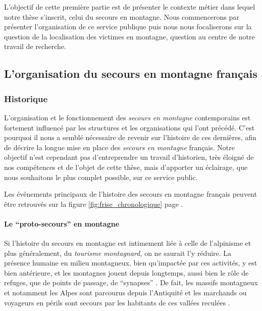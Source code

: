 L'objectif de cette première partie est de présenter le contexte
métier dans lequel notre thèse s'inscrit, celui du secours en
montagne. Nous commencerons par présenter l'organisation de ce service
publique puis nous nous focaliserons sur la question de la
localisation des victimes en montagne, question au centre de notre
travail de recherche.

\subsection{L’organisation du secours en montagne français}
\label{subsec:1-1-1}

\subsubsection{Historique}
\label{subsubsec:1-1-1-1}

L'organisation et le fonctionnement des \emph{secours en montagne}
contemporains est fortement influencé par les structures et les
organisations qui l'ont précédé. C'est pourquoi il nous a semblé
nécessaire de revenir sur l'histoire de ces dernières, afin de décrire
la longue mise en place des \emph{secours en montagne} français. Notre
objectif n'est cependant pas d'entreprendre un travail d'historien,
très éloigné de nos compétences et de l'objet de cette thèse, mais
d'apporter un éclairage, que nous souhaitons le plus complet possible,
sur ce service public.

Les événements principaux de l'histoire des secours en montagne
français peuvent être retrouvés sur la figure
\ref{fig:frise_chronologique} page \pageref{fig:frise_chronologique}.

\paragraph{Le \enquote{proto-secours} en montagne}
\label{par:1-1-1-1-1}

Si l'histoire du secours en montagne est intimement liée à celle de
l'alpinisme et plus généralement, du \emph{tourisme montagnard,} on ne
saurait l'y réduire. La présence humaine en milieu montagneux, bien
qu'impactée par ces activités, y est bien antérieure, et les montagnes
jouent depuis longtemps, aussi bien le rôle de refuges, que de points
de passage, de \enquote{synapses} \autocite[p. 337]{Brunet1992}. De
fait, les massifs montagneux et notamment les Alpes sont parcourus
depuis l'Antiquité et les marchands ou voyageurs en périls sont
secours par les habitants de ces vallées reculées
\autocite{Mezin2016}.

